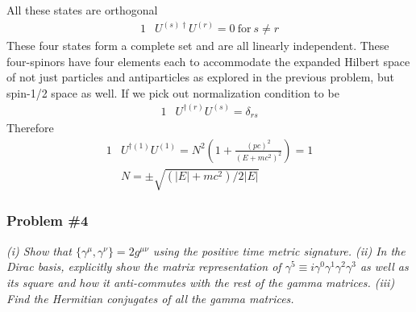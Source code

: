 \documentclass[]{article}
\numberwithin{equation}{subsection}
\begin{document}
All these states are orthogonal
\begin{alignat}{1}
  \label{i40} &U^{(s)\dagger}U^{(r)}=0\ \mathrm{for}\ s\neq r
\end{alignat}
These four states form a complete set and are all linearly independent. These four-spinors have four elements each to accommodate the expanded Hilbert space of not just particles and antiparticles as explored in the previous problem, but spin-1/2 space as well. If we pick out normalization condition to be
\begin{alignat}{1}
  \label{i41} &U^{\dagger(r)}U^{(s)}=\delta_{rs}
\end{alignat}
Therefore
\begin{alignat}{1}
  \label{i42} &U^{\dagger(1)}U^{(1)}=N^{2}(1+\frac{(pc)^{2}}{(E+mc^{2})^{2}})=1\\
  \label{ii05} &N=\pm\sqrt{(|E|+mc^{2})/2|E|}
\end{alignat}
\subsubsection*{Problem \#4}
\emph{(i) Show that $\{\gamma^{\mu},\gamma^{\nu}\}=2g^{\mu\nu}$ using the positive time metric signature. (ii) In the Dirac basis, explicitly show the matrix representation of $\gamma^{5}\equiv i\gamma^{0}\gamma^{1}\gamma^{2}\gamma^{3}$ as well as its square and how it anti-commutes with the rest of the gamma matrices. (iii) Find the Hermitian conjugates of all the gamma matrices.}\\
\end{document}

